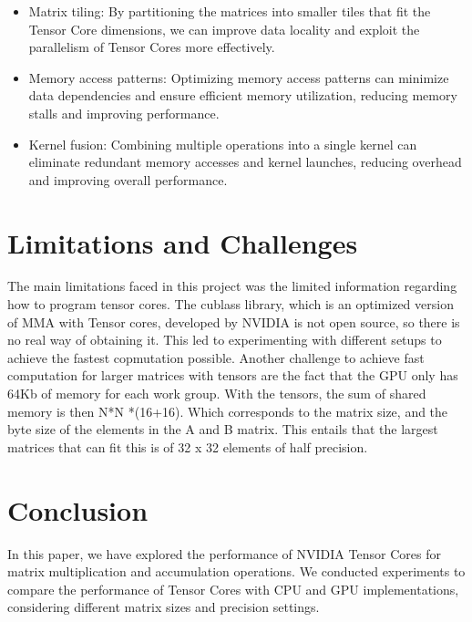\documentclass[conference]{IEEEtran}
\begin{document}
  \begin{itemize}
    \item Matrix tiling: By partitioning the matrices
    into smaller tiles that fit the Tensor Core dimensions, we can improve data locality 
    and exploit the parallelism of Tensor Cores more effectively.
    \item Memory access patterns: Optimizing memory access patterns can minimize data 
    dependencies and ensure efficient memory utilization, reducing memory stalls and improving 
    performance.
    \item Kernel fusion: Combining multiple operations into a single kernel can eliminate 
    redundant memory accesses and kernel launches, reducing overhead and improving overall performance.
    
  \end{itemize}
  
  \section{Limitations and Challenges}\label{sec:limitations-challenges}
  The main limitations faced in this project was the limited information regarding how to program tensor cores.
  The cublass library, which is an optimized version of MMA with Tensor cores, developed by NVIDIA is not open source,
  so there is no real way of obtaining it. This led to experimenting with different setups to achieve the fastest copmutation possible.
  Another challenge to achieve fast computation for larger matrices with tensors are the fact that the GPU 
  only has 64Kb of memory for each work group. With the tensors, the sum of shared memory is then N*N *(16+16).
  Which corresponds to the matrix size, and the byte size of the elements in the A and B matrix. This entails that the 
  largest matrices that can fit this is of 32 x 32 elements of half precision.


  \section{Conclusion}\label{sec:conclusion}
  
  In this paper, we have explored the performance of NVIDIA Tensor Cores for matrix multiplication and accumulation operations. 
  We conducted experiments to compare the performance of Tensor Cores with CPU and GPU implementations, 
  considering different matrix sizes and precision settings.
  



\end{document}
